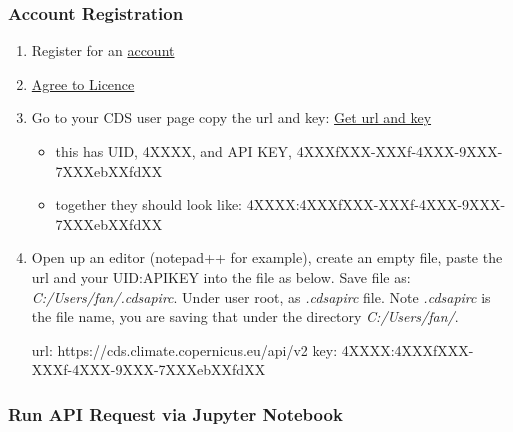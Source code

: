 \documentclass[
]{book}
\newenvironment{Shaded}{\begin{snugshade}}{\end{snugshade}}
\newcommand{\ExtensionTok}[1]{#1}
\newcommand{\NormalTok}[1]{#1}
\providecommand{\tightlist}{%
  \setlength{\itemsep}{0pt}\setlength{\parskip}{0pt}}
\begin{document}
\hypertarget{account-registration}{%
\subsubsection{Account Registration}\label{account-registration}}

\begin{enumerate}
\def\labelenumi{\arabic{enumi}.}
\item
  Register for an \href{cds.climate.copernicus.eu}{account}
\item
  \href{https://cds.climate.copernicus.eu/cdsapp/\#!/terms/licence-to-use-copernicus-products}{Agree to Licence}
\item
  Go to your CDS user page copy the url and key: \href{https://cds.climate.copernicus.eu/user}{Get url and key}

  \begin{itemize}
  \tightlist
  \item
    this has UID, 4XXXX, and API KEY, 4XXXfXXX-XXXf-4XXX-9XXX-7XXXebXXfdXX
  \item
    together they should look like: 4XXXX:4XXXfXXX-XXXf-4XXX-9XXX-7XXXebXXfdXX
  \end{itemize}
\item
  Open up an editor (notepad++ for example), create an empty file, paste the url and your UID:APIKEY into the file as below. Save file as: \emph{C:/Users/fan/.cdsapirc}. Under user root, as \emph{.cdsapirc} file. Note \emph{.cdsapirc} is the file name, you are saving that under the directory \emph{C:/Users/fan/}.

\begin{Shaded}
\begin{Highlighting}[]
\ExtensionTok{url}\NormalTok{: https://cds.climate.copernicus.eu/api/v2}
\ExtensionTok{key}\NormalTok{: 4XXXX:4XXXfXXX-XXXf-4XXX-9XXX-7XXXebXXfdXX}
\end{Highlighting}
\end{Shaded}
\end{enumerate}

\hypertarget{run-api-request-via-jupyter-notebook}{%
\subsubsection{Run API Request via Jupyter Notebook}\label{run-api-request-via-jupyter-notebook}}
\end{document}

